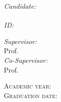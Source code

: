 \begin{titlingpage}
\begin{center}
		\begin{minipage}[t]{0.3\textwidth}
			\begin{flushleft} \large
				\emph{Candidate:}\\
				\textcolor{SchoolColor}{\AuthorName \ \textsc{\AuthorSurname}} %
				\\
				\emph{ID:} \textsc{\StudentId}
			\end{flushleft}
		\end{minipage}
		\begin{minipage}[t]{0.68\textwidth}
			\begin{flushright} \large
				\emph{Supervisor:} \\
				\textcolor{SchoolColor}{Prof. \SupName \ \textsc{\SupSurname}} %
				\vspace{10pt}\\
				\emph{Co-Supervisor:} \\
				\textcolor{SchoolColor}{Prof. \CosupName \ \textsc{\CosupSurname}} %
			\end{flushright}
		\end{minipage}

		\vfill
		\large{\textsc{Academic year:} \quad \AcademicYear}\\
		\large{\textsc{Graduation date:} \quad \GraduationDate}
	\end{center}
\end{titlingpage}
